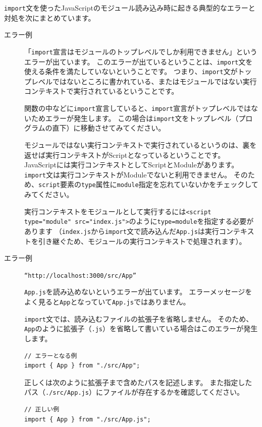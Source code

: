 \texttt{import}文を使ったJavaScriptのモジュール読み込み時に起きる典型的なエラーと対処を次にまとめています。
\newpage
\begin{description}
\item[エラー例] 

「\texttt{import}宣言はモジュールのトップレベルでしか利用できません」というエラーが出ています。
このエラーが出ているということは、\texttt{import}文を使える条件を満たしていないということです。
つまり、\texttt{import}文がトップレベルではないところに書かれている、またはモジュールではない実行コンテキストで実行されているということです。

関数の中などに\texttt{import}宣言していると、\texttt{import}宣言がトップレベルではないためエラーが発生します。
この場合は\texttt{import}文をトップレベル（プログラムの直下）に移動させてみてください。

モジュールではない実行コンテキストで実行されているというのは、裏を返せば実行コンテキストがScriptとなっているということです。
JavaScriptには実行コンテキストとしてScriptとModuleがあります。
\texttt{import}文は実行コンテキストがModuleでないと利用できません。
そのため、\texttt{script}要素の\texttt{type}属性に\texttt{module}指定を忘れていないかをチェックしてみてください。

実行コンテキストをモジュールとして実行するには\texttt{<script type="module" src="index.js">}のように\texttt{type=module}を指定する必要があります
（\texttt{index.js}から\texttt{import}文で読み込んだ\texttt{App.js}は実行コンテキストを引き継ぐため、モジュールの実行コンテキストで処理されます）。

\item[エラー例] \texttt{``http://localhost:3000/src/App''}

\texttt{App.js}を読み込めないというエラーが出ています。
エラーメッセージをよく見ると\texttt{App}となっていて\texttt{App.js}ではありません。

\texttt{import}文では、読み込むファイルの拡張子を省略しません。
そのため、\texttt{App}のように拡張子（\texttt{.js}）を省略して書いている場合はこのエラーが発生します。

\begin{lstlisting}
// エラーとなる例
import { App } from "./src/App";
\end{lstlisting}

正しくは次のように拡張子まで含めたパスを記述します。
また指定したパス（\texttt{./src/App.js}）にファイルが存在するかを確認してください。

\begin{lstlisting}
// 正しい例
import { App } from "./src/App.js";
\end{lstlisting}
\end{description}

